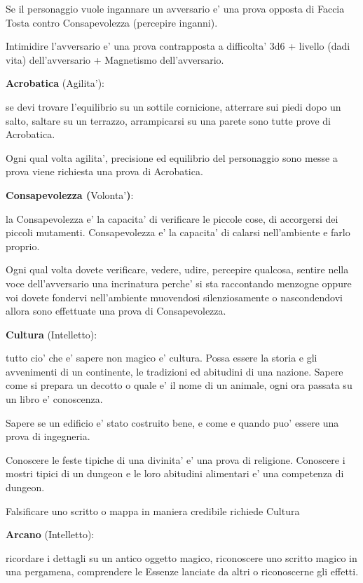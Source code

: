 \documentclass[a4paper,11pt,twoside,openany]{book}
\begin{document}
Se il personaggio vuole ingannare un avversario e' una prova opposta di Faccia Tosta contro Consapevolezza (percepire inganni).

Intimidire l'avversario e' una prova contrapposta a difficolta' 3d6 + livello (dadi vita) dell'avversario + Magnetismo dell'avversario.

\textbf{Acrobatica} (Agilita'):

se devi trovare l'equilibrio su un sottile cornicione, atterrare sui piedi dopo un salto, saltare su un terrazzo, arrampicarsi su una parete sono tutte prove di Acrobatica.

Ogni qual volta agilita', precisione ed equilibrio del personaggio sono messe a prova viene richiesta una prova di Acrobatica.

\textbf{Consapevolezza (}Volonta'\textbf{)}:

la Consapevolezza e' la capacita' di verificare le piccole cose, di accorgersi dei piccoli mutamenti. Consapevolezza e' la capacita' di calarsi nell'ambiente e farlo proprio.

Ogni qual volta dovete verificare, vedere, udire, percepire qualcosa, sentire nella voce dell'avversario una incrinatura perche' si sta raccontando menzogne oppure voi dovete fondervi nell'ambiente muovendosi silenziosamente o nascondendovi allora sono effettuate una prova di Consapevolezza.

\textbf{Cultura} (Intelletto):

tutto cio' che e' sapere non magico e' cultura. Possa essere la storia e gli avvenimenti di un continente, le tradizioni ed abitudini di una nazione. Sapere come si prepara un decotto o quale e' il nome di un animale, ogni ora passata su un libro e' conoscenza.

Sapere se un edificio e' stato costruito bene, e come e quando puo' essere una prova di ingegneria.

Conoscere le feste tipiche di una divinita' e' una prova di religione. Conoscere i mostri tipici di un dungeon e le loro abitudini alimentari e' una competenza di dungeon.

Falsificare uno scritto o mappa in maniera credibile richiede Cultura

\textbf{Arcano} (Intelletto):

ricordare i dettagli su un antico oggetto magico, riconoscere uno scritto magico in una pergamena, comprendere le Essenze lanciate da altri o riconoscerne gli effetti.
\end{document}
